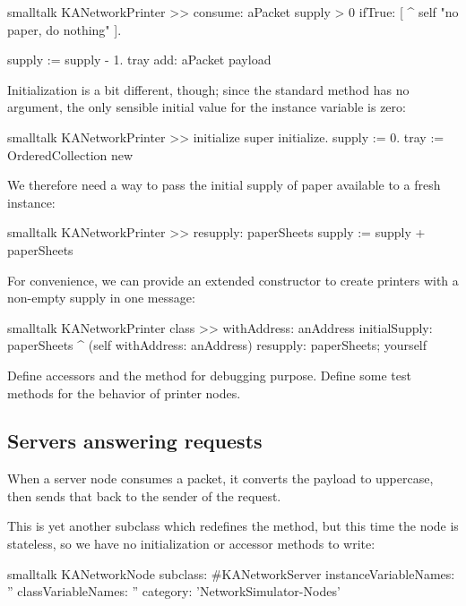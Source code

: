 \documentclass[10pt,twoside,english]{_support/latex/sbabook/sbabook}
\begin{document}
\begin{displaycode}{smalltalk}
KANetworkPrinter >> consume: aPacket
    supply > 0 ifTrue: [ ^ self "no paper, do nothing" ].

    supply := supply - 1.
    tray add: aPacket payload
\end{displaycode}

Initialization is a bit different, though; since the standard  method has no argument, the only sensible initial value for the  instance variable is zero:

\begin{displaycode}{smalltalk}
KANetworkPrinter >> initialize
    super initialize.
    supply := 0.
    tray := OrderedCollection new
\end{displaycode}

We therefore need a way to pass the initial supply of paper available to a fresh instance:

\begin{displaycode}{smalltalk}
KANetworkPrinter >> resupply: paperSheets
    supply := supply + paperSheets
\end{displaycode}

For convenience, we can provide an extended constructor to create printers with a non-empty supply in one message:

\begin{displaycode}{smalltalk}
KANetworkPrinter class >> withAddress: anAddress initialSupply: paperSheets
    ^ (self withAddress: anAddress)
        resupply: paperSheets;
        yourself
\end{displaycode}

Define accessors and the  method for debugging purpose. 
Define some test methods for the behavior of printer nodes.
\subsection{Servers answering requests}
When a server node consumes a packet, it converts the payload to uppercase, then sends that back to the sender of the request.

This is yet another subclass which redefines the  method, but this time the node is stateless, so we have no initialization or accessor methods to write:

\begin{displaycode}{smalltalk}
KANetworkNode subclass: #KANetworkServer
    instanceVariableNames: ''
    classVariableNames: ''
    category: 'NetworkSimulator-Nodes'
\end{displaycode}
\end{document}
